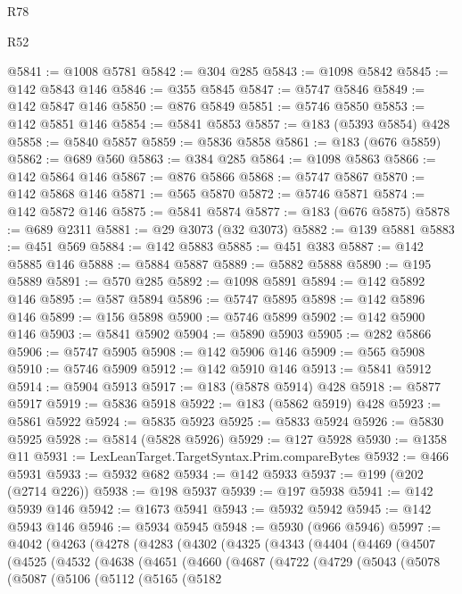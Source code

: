 \begin{lexlean}{R78}
\begin{lexlean}{R52}
\begin{coremodule}
{{{{{{{{{{{{{{{{{{{{{{{{{{{{{{{{{{{{{{{{{{{{{{{{{{{{{{{{{{{{{{{{{{{{{{{{{{{{{{{{{{{{{{{{{{{{{{{{{{{{{{{{{{{{{{{{{{{{{{{{{{{{{{{{{{{{{{{{{{{{{{{{{{{{{{{{{{{{{{{{{{{{{{{{{{{{{{{{{{{{{{{{{{{{{{{{{{{{{{@5841 := @1008 @5781
@5842 := @304 @285
@5843 := @1098 @5842
@5845 := @142 @5843 @146
@5846 := @355 @5845
@5847 := @5747 @5846
@5849 := @142 @5847 @146
@5850 := @876 @5849
@5851 := @5746 @5850
@5853 := @142 @5851 @146
@5854 := @5841 @5853
@5857 := @183 (@5393 @5854) @428
@5858 := @5840 @5857
@5859 := @5836 @5858
@5861 := @183 (@676 @5859)
@5862 := @689 @560
@5863 := @384 @285
@5864 := @1098 @5863
@5866 := @142 @5864 @146
@5867 := @876 @5866
@5868 := @5747 @5867
@5870 := @142 @5868 @146
@5871 := @565 @5870
@5872 := @5746 @5871
@5874 := @142 @5872 @146
@5875 := @5841 @5874
@5877 := @183 (@676 @5875)
@5878 := @689 @2311
@5881 := @29 @3073 (@32 @3073)
@5882 := @139 @5881
@5883 := @451 @569
@5884 := @142 @5883
@5885 := @451 @383
@5887 := @142 @5885 @146
@5888 := @5884 @5887
@5889 := @5882 @5888
@5890 := @195 @5889
@5891 := @570 @285
@5892 := @1098 @5891
@5894 := @142 @5892 @146
@5895 := @587 @5894
@5896 := @5747 @5895
@5898 := @142 @5896 @146
@5899 := @156 @5898
@5900 := @5746 @5899
@5902 := @142 @5900 @146
@5903 := @5841 @5902
@5904 := @5890 @5903
@5905 := @282 @5866
@5906 := @5747 @5905
@5908 := @142 @5906 @146
@5909 := @565 @5908
@5910 := @5746 @5909
@5912 := @142 @5910 @146
@5913 := @5841 @5912
@5914 := @5904 @5913
@5917 := @183 (@5878 @5914) @428
@5918 := @5877 @5917
@5919 := @5836 @5918
@5922 := @183 (@5862 @5919) @428
@5923 := @5861 @5922
@5924 := @5835 @5923
@5925 := @5833 @5924
@5926 := @5830 @5925
@5928 := @5814 (@5828 @5926)
@5929 := @127 @5928
@5930 := @1358 @11
@5931 := LexLeanTarget.TargetSyntax.Prim.compareBytes
@5932 := @466 @5931
@5933 := @5932 @682
@5934 := @142 @5933
@5937 := @199 (@202 (@2714 @226))
@5938 := @198 @5937
@5939 := @197 @5938
@5941 := @142 @5939 @146
@5942 := @1673 @5941
@5943 := @5932 @5942
@5945 := @142 @5943 @146
@5946 := @5934 @5945
@5948 := @5930 (@966 @5946)
@5997 := @4042
    (@4263
      (@4278
        (@4283
          (@4302
            (@4325
              (@4343
                (@4404
                  (@4469
                    (@4507
                      (@4525
                        (@4532
                          (@4638
                            (@4651
                              (@4660
                                (@4687
                                  (@4722
                                    (@4729
                                      (@5043
                                        (@5078
                                          (@5087
                                            (@5106
                                              (@5112
                                                (@5165
                                                  (@5182
}}}}}}}}}}}}}}}}}}}}}}}}}}}}}}}}}}}}}}}}}}}}}}}}}}}}}}}}}}}}}}}}}}}}}}}}}}}}}}}}}}}}}}}}}}}}}}}}}}}}}}}}}}}}}}}}}}}}}}}}}}}}}}}}}}}}}}}}}}}}}}}}}}}}}}}}}}}}}}}}}}}}}}}}}}}}}}}}}}}}}}}}}}}}}}}}}}}}}}
\end{coremodule}
\end{lexlean}
\end{lexlean}
